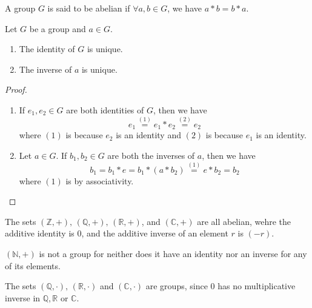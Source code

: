 \documentclass[notoc,notitlepage]{tufte-book}
\begin{document}
\begin{defn}\label{defn:abelian_group}
  A group $G$ is said to be abelian if $\forall a, b \in G$, we have $a * b = b * a$.
\end{defn}

\begin{propo}\label{propo:uniqueness_of_group_identity_and_group_element_inverse}
  Let $G$ be a group and $a \in G$.
  \begin{enumerate}
    \item The identity of $G$ is unique.
    \item The inverse of $a$ is unique.
  \end{enumerate}
\end{propo}

\begin{proof}
  \begin{enumerate}
    \item If $e_1, e_2 \in G$ are both identities of $G$, then we have
      \begin{equation*}
        e_1 \overset{(1)}{=} e_1 * e_2 \overset{(2)}{=} e_2
      \end{equation*}
      where $(1)$ is because $e_2$ is an identity and $(2)$ is because $e_1$ is an identity.

    \item Let $a \in G$. If $b_1, b_2 \in G$ are both the inverses of $a$, then we have
      \begin{equation*}
        b_1 = b_1 * e = b_1 * (a * b_2) \overset{(1)}{=} e * b_2 = b_2
      \end{equation*}
      where $(1)$ is by associativity.
  \end{enumerate}
\end{proof}

\begin{eg}
  The sets $(\mathbb{Z}, +), \, (\mathbb{Q}, +), \, (\mathbb{R}, +)$, and $(\mathbb{C}, +)$ are all abelian, wehre the additive identity is $0$, and the additive inverse of an element $r$ is $(-r)$.
\end{eg}

\begin{note}
  $(\mathbb{N}, +)$ is not a group for neither does it have an identity nor an inverse for any of its elements.
\end{note}

\begin{eg}
  The sets $(\mathbb{Q}, \cdot), \, (\mathbb{R}, \cdot)$ and $(\mathbb{C}, \cdot)$ are  groups, since $0$ has no multiplicative inverse in $\mathbb{Q}, \mathbb{R}$ or $\mathbb{C}$.
\end{eg}
\end{document}
